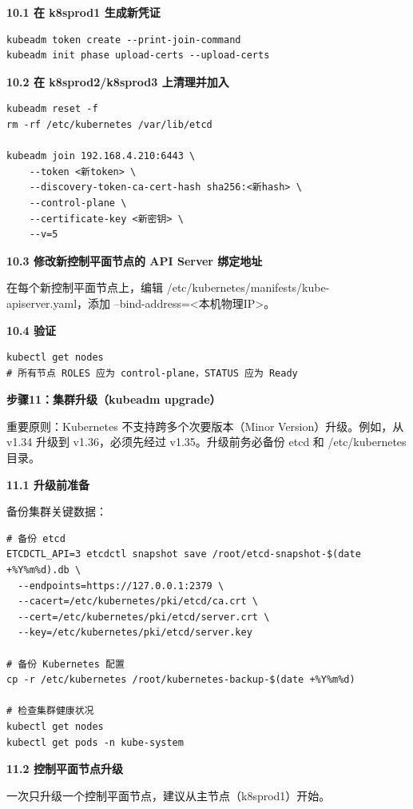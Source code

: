 \documentclass[12pt,UTF8]{ctexbook}
\begin{document}
\textbf{10.1 在 k8sprod1 生成新凭证}

\begin{lstlisting}
kubeadm token create --print-join-command
kubeadm init phase upload-certs --upload-certs
\end{lstlisting}

\textbf{10.2 在 k8sprod2/k8sprod3 上清理并加入}

\begin{lstlisting}
kubeadm reset -f
rm -rf /etc/kubernetes /var/lib/etcd

kubeadm join 192.168.4.210:6443 \
    --token <新token> \
    --discovery-token-ca-cert-hash sha256:<新hash> \
    --control-plane \
    --certificate-key <新密钥> \
    --v=5
\end{lstlisting}

\textbf{10.3 修改新控制平面节点的 API Server 绑定地址}

在每个新控制平面节点上，编辑 /etc/kubernetes/manifests/kube-apiserver.yaml，添加 --bind-address=<本机物理IP>。

\textbf{10.4 验证}

\begin{lstlisting}
kubectl get nodes
# 所有节点 ROLES 应为 control-plane，STATUS 应为 Ready
\end{lstlisting}

\textbf{步骤11：集群升级（kubeadm upgrade）}

重要原则：Kubernetes 不支持跨多个次要版本（Minor Version）升级。例如，从 v1.34 升级到 v1.36，必须先经过 v1.35。升级前务必备份 etcd 和 /etc/kubernetes 目录。

\textbf{11.1 升级前准备}

备份集群关键数据：

\begin{lstlisting}
# 备份 etcd
ETCDCTL_API=3 etcdctl snapshot save /root/etcd-snapshot-$(date +%Y%m%d).db \
  --endpoints=https://127.0.0.1:2379 \
  --cacert=/etc/kubernetes/pki/etcd/ca.crt \
  --cert=/etc/kubernetes/pki/etcd/server.crt \
  --key=/etc/kubernetes/pki/etcd/server.key

# 备份 Kubernetes 配置
cp -r /etc/kubernetes /root/kubernetes-backup-$(date +%Y%m%d)

# 检查集群健康状况
kubectl get nodes
kubectl get pods -n kube-system
\end{lstlisting}

\textbf{11.2 控制平面节点升级}

一次只升级一个控制平面节点，建议从主节点（k8sprod1）开始。
\end{document}

